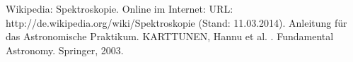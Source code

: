 \begin{thebibliography}{9}
 Wikipedia: Spektroskopie. Online im Internet: URL: http://de.wikipedia.org/wiki/Spektroskopie (Stand: 11.03.2014). 
 Anleitung für das Astronomische Praktikum.
 KARTTUNEN, Hannu et al. . Fundamental Astronomy. Springer, 2003.
\end{thebibliography}